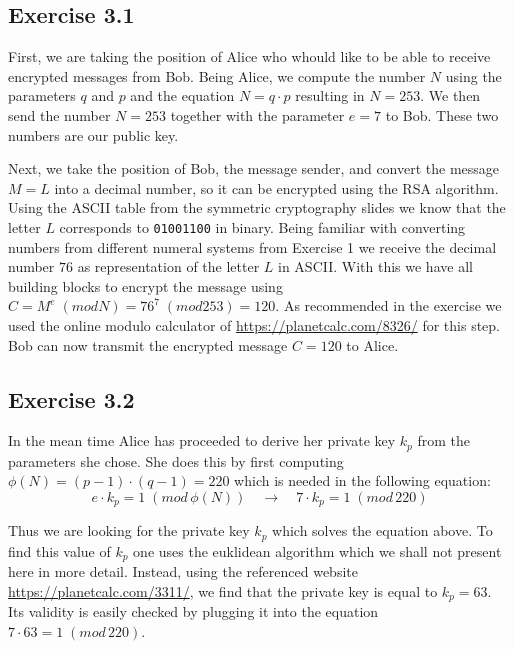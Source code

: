 \documentclass[12pt]{article}
\begin{document}
\subsection*{Exercise 3.1}

First, we are taking the position of Alice who whould like to be able to receive encrypted messages from Bob. Being Alice, we compute the number $N$ using the parameters $q$ and $p$ and the equation $ N = q \cdot p$ resulting in $N = 253$. We then send the number $N=253$ together with the parameter $e=7$ to Bob. These two numbers are our public key.\par 
Next, we take the position of Bob, the message sender, and convert the message $M=L$ into a decimal number, so it can be encrypted using the RSA algorithm. Using the ASCII table from the symmetric cryptography slides we know that the letter $L$ corresponds to \texttt{01001100} in binary. Being familiar with converting numbers from different numeral systems from Exercise 1 we receive the decimal number $76$ as representation of the letter $L$ in ASCII. With this we have all building blocks to encrypt the message using $C = M^e\;(mod N) = 76^7\;(mod 253) = 120$. As recommended in the exercise we used the online modulo calculator of \href{https://planetcalc.com/8326/}{https://planetcalc.com/8326/} for this step. Bob can now transmit the encrypted message $C = 120$ to Alice.

\subsection*{Exercise 3.2}

In the mean time Alice has proceeded to derive her private key $k_{p}$ from the parameters she chose. She does this by first computing $\phi(N) = (p-1) \cdot(q-1) = 220$ which is needed in the following equation:
\begin{equation*}
	e \cdot k_p = 1\; (mod\, \phi(N))\quad  \rightarrow \quad 7 \cdot k_p = 1\; (mod\, 220)
\end{equation*}

Thus we are looking for the private key $k_p$ which solves the equation above. To find this value of $k_p$ one uses the euklidean algorithm which we shall not present here in more detail. Instead, using the referenced website \href{https://planetcalc.com/3311/}{https://planetcalc.com/3311/}, we find that the private key is equal to $k_p = 63$. Its validity is easily checked by plugging it into the equation $7 \cdot 63 = 1\;(mod\, 220)$. 
\end{document}
